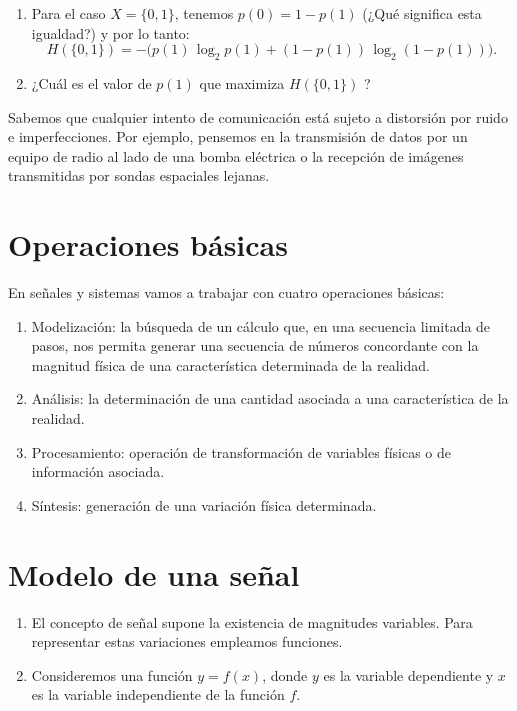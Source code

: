 \begin{enumerate}
	\item Para el caso $X = \{0, 1\}$, tenemos $p(0) = 1 - p(1)$ (¿Qué significa esta igualdad?) y por lo tanto:
	\begin{equation}
		H(\{0,1\}) = - \Big( p(1) \, \log_{2} p(1) + (1 - p(1)) \, \log_{2} (1 - p(1)) \Big).
	\end{equation}
	
	\item ¿Cuál es el valor de $p(1)$ que maximiza $H(\{0,1\})$ ?
\end{enumerate}

Sabemos que cualquier intento de comunicación está sujeto a distorsión por ruido e imperfecciones. Por ejemplo, pensemos en la transmisión de datos por un equipo de radio al lado de una bomba eléctrica o la recepción de imágenes transmitidas por sondas espaciales lejanas.

\section{Operaciones básicas}

En señales y sistemas vamos a trabajar con cuatro operaciones básicas:
\begin{enumerate}
	\item Modelización: la búsqueda de un cálculo que, en una secuencia limitada de pasos, nos permita generar una secuencia de números concordante con la magnitud física de una característica determinada de la realidad.
	\item Análisis: la determinación de una cantidad asociada a una característica de la realidad.
	\item Procesamiento: operación de transformación de variables físicas o de información asociada.
	\item Síntesis: generación de una variación física determinada.
\end{enumerate}


\section{Modelo de una señal}

\begin{enumerate}
	\item El concepto de señal supone la existencia de magnitudes variables. Para representar estas variaciones empleamos funciones.
	\item Consideremos una función $y = f(x)$, donde $y$ es la variable dependiente y $x$ es la variable independiente de la función $f$.
\end{enumerate}

